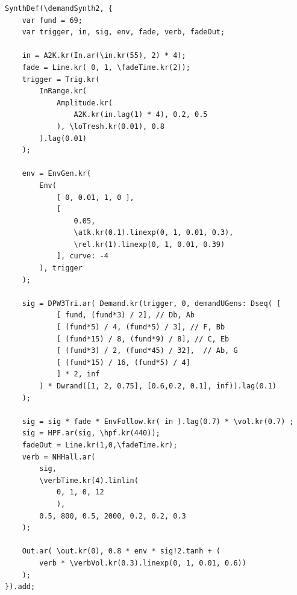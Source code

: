 \documentclass{article}
\renewcommand{\baselinestretch}{1.5}
\begin{document}
\renewcommand{\baselinestretch}{1}
\begin{lstlisting}[style=SuperCollider-IDE, caption=SynthDef för amplitudtriggning från \emph{Koltrast}]
SynthDef(\demandSynth2, {
	var fund = 69;
	var trigger, in, sig, env, fade, verb, fadeOut;

	in = A2K.kr(In.ar(\in.kr(55), 2) * 4);
	fade = Line.kr( 0, 1, \fadeTime.kr(2));
	trigger = Trig.kr(
		InRange.kr( 
			Amplitude.kr(
				A2K.kr(in.lag(1) * 4), 0.2, 0.5
			), \loTresh.kr(0.01), 0.8 
		).lag(0.01)
	);

	env = EnvGen.kr(
		Env( 
			[ 0, 0.01, 1, 0 ],
			[
				0.05,
				\atk.kr(0.1).linexp(0, 1, 0.01, 0.3),
				\rel.kr(1).linexp(0, 1, 0.01, 0.39) 
			], curve: -4
		), trigger
	);

	sig = DPW3Tri.ar( Demand.kr(trigger, 0, demandUGens: Dseq( [ 
			[ fund, (fund*3) / 2], // Db, Ab
			[ (fund*5) / 4, (fund*5) / 3], // F, Bb
			[ (fund*15) / 8, (fund*9) / 8], // C, Eb
			[ (fund*3) / 2, (fund*45) / 32],  // Ab, G
			[ (fund*15) / 16, (fund*5) / 4]
			] * 2, inf
		) * Dwrand([1, 2, 0.75], [0.6,0.2, 0.1], inf)).lag(0.1)
	);

	sig = sig * fade * EnvFollow.kr( in ).lag(0.7) * \vol.kr(0.7) ;
	sig = HPF.ar(sig, \hpf.kr(440));
	fadeOut = Line.kr(1,0,\fadeTime.kr);
	verb = NHHall.ar(
		sig, 
		\verbTime.kr(4).linlin(
			0, 1, 0, 12
			), 
		0.5, 800, 0.5, 2000, 0.2, 0.2, 0.3
	);

	Out.ar( \out.kr(0), 0.8 * env * sig!2.tanh + ( 
		verb * \verbVol.kr(0.3).linexp(0, 1, 0.01, 0.6))
	);  
}).add;
\end{lstlisting}
\renewcommand{\baselinestretch}{1.5}




\end{document}
